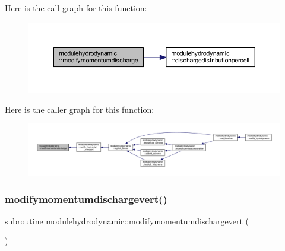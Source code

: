 Here is the call graph for this function\+:\nopagebreak
\begin{figure}[H]
\begin{center}
\leavevmode
\includegraphics[width=350pt]{namespacemodulehydrodynamic_af3229a2d204d8a2f73afcb48b571d62e_cgraph}
\end{center}
\end{figure}
Here is the caller graph for this function\+:\nopagebreak
\begin{figure}[H]
\begin{center}
\leavevmode
\includegraphics[width=350pt]{namespacemodulehydrodynamic_af3229a2d204d8a2f73afcb48b571d62e_icgraph}
\end{center}
\end{figure}
\mbox{\label{namespacemodulehydrodynamic_a3f760d4a01b6aa649a0bc54d3b96ff54}} 
\subsubsection{\texorpdfstring{modifymomentumdischargevert()}{modifymomentumdischargevert()}}
{\footnotesize\ttfamily subroutine modulehydrodynamic\+::modifymomentumdischargevert (\begin{DoxyParamCaption}{ }\end{DoxyParamCaption})\hspace{0.3cm}{\ttfamily [private]}}

